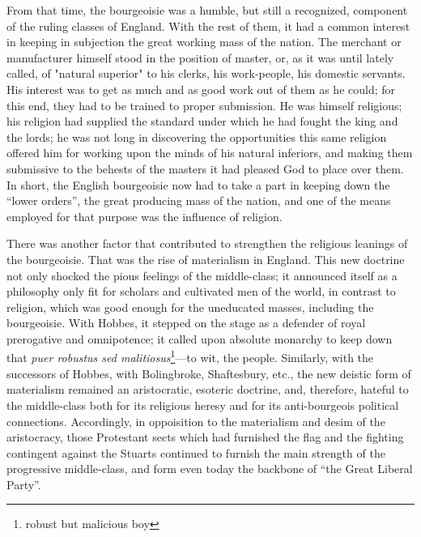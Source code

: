 From that time, the bourgeoisie was a humble, but still a recognized, component
of the ruling classes of England. With the rest of them, it had a common
interest in keeping in subjection the great working mass of the nation. The
merchant or manufacturer himself stood in the position of master, or, as it was
until lately called, of "natural superior" to his clerks, his work-people, his
domestic servants. His interest was to get as much and as good work out of them
as he could; for this end, they had to be trained to proper submission. He was
himself religious; his religion had supplied the standard under which he had
fought the king and the lords; he was not long in discovering the opportunities
this same religion offered him for working upon the minds of his natural
inferiors, and making them submissive to the behests of the masters it had
pleased God to place over them. In short, the English bourgeoisie now had to
take a part in keeping down the ``lower orders'', the great producing mass of
the nation, and one of the means employed for that purpose was the influence of
religion. 

There was another factor that contributed to strengthen the religious leanings
of the bourgeoisie. That was the rise of materialism in England. This new
doctrine not only shocked the pious feelings of the middle-class; it announced
itself as a philosophy only fit for scholars and cultivated men of the world,
in contrast to religion, which was good enough for the uneducated masses,
including the bourgeoisie. With Hobbes, it stepped on the stage as a defender of
royal prerogative and omnipotence; it called upon absolute monarchy to keep down
that \emph{puer robustus sed malitiosus}\footnote{robust but malicious boy}---to
wit, the people. Similarly, with the successors of Hobbes, with Bolingbroke,
Shaftesbury, etc., the new deistic form of materialism remained an aristocratic,
esoteric doctrine, and, therefore, hateful to the middle-class both for its
religious heresy and for its anti-bourgeois political connections. Accordingly,
in oppoisition to the materialism and desim of the aristocracy, those
Protestant sects which had furnished the flag and the fighting contingent
against the Stuarts continued to furnish the main strength of the progressive
middle-class, and form even today the backbone of ``the Great Liberal Party''.

